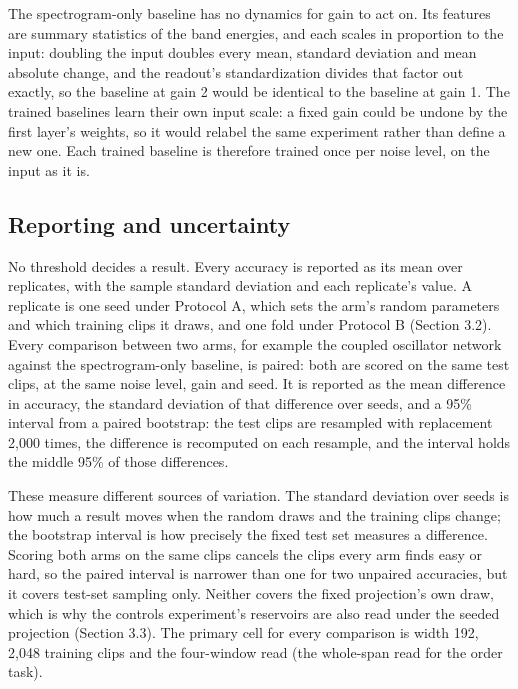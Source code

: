 \documentclass[10pt]{article}
\begin{document}
The spectrogram-only baseline has no dynamics for gain to act on. Its
features are summary statistics of the band energies, and each scales in
proportion to the input: doubling the input doubles every mean, standard
deviation and mean absolute change, and the readout's standardization
divides that factor out exactly, so the baseline at gain 2 would be
identical to the baseline at gain 1. The trained baselines learn their
own input scale: a fixed gain could be undone by the first layer's
weights, so it would relabel the same experiment rather than define a
new one. Each trained baseline is therefore trained once per noise
level, on the input as it is.

\subsection{Reporting and uncertainty}\label{reporting-and-uncertainty}

No threshold decides a result. Every accuracy is reported as its mean
over replicates, with the sample standard deviation and each replicate's
value. A replicate is one seed under Protocol A, which sets the arm's
random parameters and which training clips it draws, and one fold under
Protocol B (Section 3.2). Every comparison between two arms, for example
the coupled oscillator network against the spectrogram-only baseline, is
paired: both are scored on the same test clips, at the same noise level,
gain and seed. It is reported as the mean difference in accuracy, the
standard deviation of that difference over seeds, and a 95\% interval
from a paired bootstrap: the test clips are resampled with replacement
2,000 times, the difference is recomputed on each resample, and the
interval holds the middle 95\% of those differences.

These measure different sources of variation. The standard deviation
over seeds is how much a result moves when the random draws and the
training clips change; the bootstrap interval is how precisely the fixed
test set measures a difference. Scoring both arms on the same clips
cancels the clips every arm finds easy or hard, so the paired interval
is narrower than one for two unpaired accuracies, but it covers test-set
sampling only. Neither covers the fixed projection's own draw, which is
why the controls experiment's reservoirs are also read under the seeded
projection (Section 3.3). The primary cell for every comparison is width
192, 2,048 training clips and the four-window read (the whole-span read
for the order task).
\end{document}
